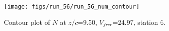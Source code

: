 \begin{figure}[H]
\centering
\texttt{[image: figs/run\_56/run\_56\_num\_contour]}
\caption{Contour plot of $N$ at $z/c$=9.50, $V_{free}$=24.97, station 6.}
\label{fig:run_56_num_contour}
\end{figure}



